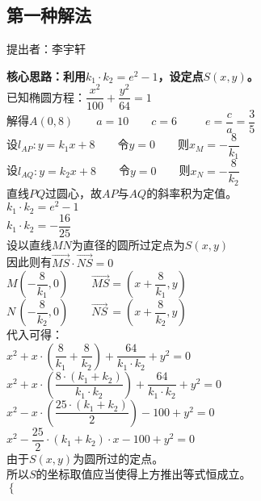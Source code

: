 \documentclass[UTF8]{ctexart}
\begin{document}
\subsection{第一种解法}
    \begin{center}
        提出者：李宇轩
    \end{center}
    \begin{multicols}{2}
        \small
        \textbf{核心思路：利用$k_1\cdot k_2=e^2-1$，设定点$S(x,y)$。}\\[4mm]
        已知椭圆方程：$\dfrac{x^2}{100}+\dfrac{y^2}{64}=1$\\[5mm]
        解得$A(0,8)$~~~~$a=10$~~~~$c=6$~~~~~$e=\dfrac{c}{a}=\dfrac{3}{5}$\\[5mm]
        设$l_{AP}:y=k_1x+8$~~~~令$y=0$~~~~则$x_M=-\dfrac{8}{k_1}$\\[5mm]
        设$l_{AQ}:y=k_2x+8$~~~~令$y=0$~~~~则$x_N=-\dfrac{8}{k_2}$\\[8mm]
        直线$PQ$过圆心，故$AP$与$AQ$的斜率积为定值。\\[4mm]
        $k_1\cdot k_2=e^2-1$\\[5mm]
        $k_1\cdot k_2=-\dfrac{16}{25}$\\[8mm]
        设以直线$MN$为直径的圆所过定点为$S(x,y)$\\[5mm]
        因此则有$\overrightarrow{MS}\cdot\overrightarrow{NS}=0$\\[5mm]
        $M\left(-\dfrac{8}{k_1},0\right)$~~~~$\overrightarrow{MS}=\left(x+\dfrac{8}{k_1},y\right)$\\[5mm]
        $N\,\left(-\dfrac{8}{k_2},0\right)$~~~~$\overrightarrow{NS}\,=\left(x+\dfrac{8}{k_2},y\right)$\\[12mm]
        代入可得：\\[3mm]
        $x^2+x\cdot\left(\dfrac{8}{k_1}+\dfrac{8}{k_2}\right)+\dfrac{64}{k_1\cdot k_2}+y^2=0$\\[5mm]
        $x^2+x\cdot\left(\dfrac{8\cdot(k_1+k_2)}{k_1\cdot k_2}\right)+\dfrac{64}{k_1\cdot k_2}+y^2=0$\\[5mm]
        $x^2-x\cdot\left(\dfrac{25\cdot(k_1+k_2)}{2}\right)-100+y^2=0$\\[5mm]
        $x^2-\dfrac{25}{2}\cdot(k_1+k_2)\cdot x-100+y^2=0$\\[30mm]
        由于$S(x,y)$为圆所过的定点。\\[3mm]
        所以$S$的坐标取值应当使得上方推出等式恒成立。\\[5mm]
        \begin{math}
            \begin{cases}

\end{cases}
\end{math}
\end{multicols}
\end{document}
